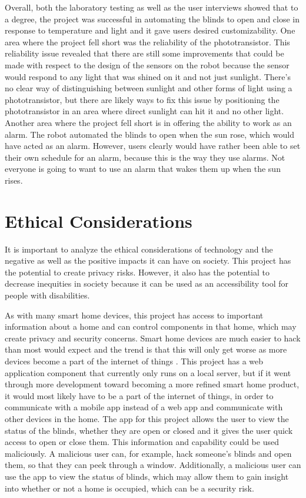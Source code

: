 \documentclass[10pt,twocolumn]{article}
\begin{document}
Overall, both the laboratory testing as well as the user interviews showed that to a degree, the project was successful in automating the blinds to open and close in response to temperature and light and it gave users desired customizability. One area where the project fell short was the reliability of the phototransistor. This reliability issue revealed that there are still some improvements that could be made with respect to the design of the sensors on the robot because the sensor would respond to any light that was shined on it and not just sunlight. There’s no clear way of distinguishing between sunlight and other forms of light using a phototransistor, but there are likely ways to fix this issue by positioning the phototransistor in an area where direct sunlight can hit it and no other light. Another area where the project fell short is in offering the ability to work as an alarm. The robot automated the blinds to open when the sun rose, which would have acted as an alarm. However, users clearly would have rather been able to set their own schedule for an alarm, because this is the way they use alarms. Not everyone is going to want to use an alarm that wakes them up when the sun rises. 

\section{Ethical Considerations}
It is important to analyze the ethical considerations of technology and the negative as well as the positive impacts it can have on society. This project has the potential to create privacy risks. However, it also has the potential to decrease inequities in society because it can be used as an accessibility tool for people with disabilities.

As with many smart home devices, this project has access to important information about a home and can control components in that home, which may create privacy and security concerns. Smart home devices are much easier to hack than most would expect and the trend is that this will only get worse as more devices become a part of the internet of things \cite{Hunter2021Buggy}. This project has a web application component that currently only runs on a local server, but if it went through more development toward becoming a more refined smart home product, it would most likely have to be a part of the internet of things, in order to communicate with a mobile app instead of a web app and communicate with other devices in the home. The app for this project allows the user to view the status of the blinds, whether they are open or closed and it gives the user quick access to open or close them. This information and capability could be used maliciously. A malicious user can, for example, hack someone’s blinds and open them, so that they can peek through a window. Additionally, a malicious user can use the app to view the status of blinds, which may allow them to gain insight into whether or not a home is occupied, which can be a security risk.
\end{document}
